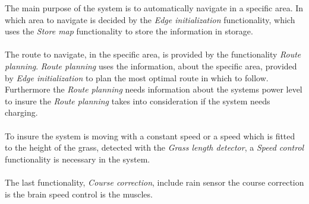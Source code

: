 \noindent
The main purpose of the system is to automatically navigate in a specific area. In which area to navigate is decided by the \textit{Edge initialization} functionality, which uses the \textit{Store map} functionality to store the information in storage.\\\\
The route to navigate, in the specific area, is provided by the functionality \textit{Route planning}. \textit{Route planning} uses the information, about the specific area, provided by \textit{Edge initialization} to plan the most optimal route in which to follow. Furthermore the \textit{Route planning} needs information about the systems power level to insure the \textit{Route planning} takes into consideration if the system needs charging.\\\\
To insure the system is moving with a constant speed or a speed which is fitted to the height of the grass, detected with the \textit{Grass length detector}, a \textit{Speed control} functionality is necessary in the system.\\\\
The last functionality, \textit{Course correction},  
include rain sensor
the course correction is the brain speed control is the muscles. 

 


 
 